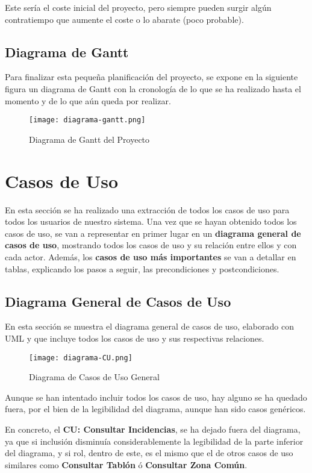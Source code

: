 Este sería el coste inicial del proyecto, pero siempre pueden surgir algún contratiempo que aumente el coste o lo abarate (poco probable).

\subsection{Diagrama de Gantt}
Para finalizar esta pequeña planificación del proyecto, se expone en la siguiente figura un diagrama de Gantt con la cronología de lo que se ha realizado hasta el momento y de lo que aún queda por realizar.

\begin{figure}[ht]
	\centering
	\texttt{[image: diagrama-gantt.png]}
	\caption{Diagrama de Gantt del Proyecto}
\end{figure}

\section{Casos de Uso}
En esta sección se ha realizado una extracción de todos los casos de uso para todos los usuarios de nuestro sistema. Una vez que se hayan obtenido todos los casos de uso, se van a representar en primer lugar en un \textbf{diagrama general de casos de uso}, mostrando todos los casos de uso y su relación entre ellos y con cada actor. Además, los \textbf{casos de uso más importantes} se van a detallar en tablas, explicando los pasos a seguir, las precondiciones y postcondiciones.

\subsection{Diagrama General de Casos de Uso}
En esta sección se muestra el diagrama general de casos de uso, elaborado con UML y que incluye todos los casos de uso y sus respectivas relaciones.

\begin{figure}[ht]
	\centering
	\texttt{[image: diagrama-CU.png]}
	\caption{Diagrama de Casos de Uso General}
\end{figure}

Aunque se han intentado incluir todos los casos de uso, hay alguno se ha quedado fuera, por el bien de la legibilidad del diagrama, aunque han sido casos genéricos. 

En concreto, el \textbf{CU: Consultar Incidencias}, se ha dejado fuera del diagrama, ya que si inclusión disminuía considerablemente la legibilidad de la parte inferior del diagrama, y si rol, dentro de este, es el mismo que el de otros casos de uso similares como \textbf{Consultar Tablón} ó \textbf{Consultar Zona Común}.

